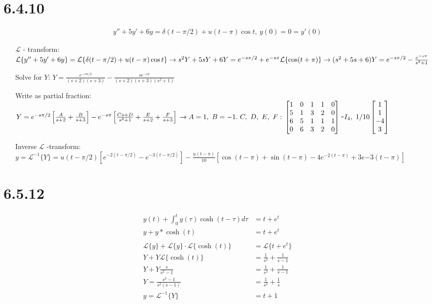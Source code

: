 \documentclass[11pt,a4paper]{article}
\newcommand{\Laplace}{\mathcal{L}}
\begin{document}
\section*{6.4.10}
\begin{align*}
    y'' + 5y' + 6y = \delta (t - \pi / 2) + u(t-\pi)\cos t,\ y(0)=0=y'(0)
\end{align*}
\begin{itemize}[leftmargin=4.0cm,labelsep=0.5cm]
\item[$\Laplace$ - transform:]
    $\Laplace\{y'' + 5y' + 6y \} = \Laplace\{\delta (t - \pi / 2) + u(t-\pi)\cos t\} \\
    \rightarrow s^2 Y + 5sY + 6Y 
    = e^{-s\pi/2} + e^{-s\pi}\Laplace\{\cos (t+\pi)\} \\
    \rightarrow (s^2+5s+6)Y = e^{-s\pi/2} - \frac{e^{-s\pi}}{s^2+1}$ 
\item[Solve for $Y$:]
    $Y = \frac{e^{-s\pi/2}}{(s+2)(s+3)} - \frac{se^{-s\pi}}{(s+2)(s+3)(s^2+1)}$
\item[Write as partial fraction:]
    $Y 
    = e^{-s\pi/2} \left[\frac{A}{s+2} + \frac{B}{s+3}\right]
    - e^{-s\pi} \left[\frac{Cs+D}{s^2+1} + \frac{E}{s+2} + \frac{F}{s+3}\right] \\
    \rightarrow A = 1,\ B = -1.\ C,\ D,\ E,\ F:\\
    \begin{bmatrix}
        1 & 0 &1  &1  &0 \\ 
        5 &1  &3  &2  &0 \\ 
        6 &5  &1  &1  &1 \\ 
        0 &6  &3  &2  &0 
    \end{bmatrix} 
    \verb|~| I_4,\ 1/10
    \begin{bmatrix}
    1\\ 1\\ -4\\ 3
    \end{bmatrix}$
\item[Inverse $\Laplace$ -transform:]
    $y = \Laplace^{-1}\{Y\}
    = u(t-\pi/2)[e^{-2(t-\pi/2)}-e^{-3(t-\pi/2)}] 
    - \frac{u(t-\pi)}{10} [\cos(t-\pi) + \sin(t-\pi) - 4e^{-2(t-\pi)}+3e{-3(t-\pi)}] 
    $
\end{itemize}

\section*{6.5.12}
\begin{align*}
    y(t) + \int_0^t y(\tau)\cosh(t-\tau)d\tau &= t + e^t \\
    y + y * \cosh(t) &= t + e^t \\ \\
    \Laplace\{y\} + \Laplace\{y\} \cdot \Laplace\{\cosh(t)\} &= \Laplace\{t+e^t\} \\
    Y + Y \Laplace\{\cosh(t)\} &= \frac{1}{s^2} + \frac{1}{s-1} \\
    Y + Y \frac{s}{s^2-1} &= \frac{1}{s^2} + \frac{1}{s-1} \\
    Y = \frac{s^2-1}{s^2(s-1)} &= \frac{1}{s^2} + \frac{1}{s} \\
    y = \Laplace^{-1}\{Y\} &= t + 1
\end{align*}
\end{document}
